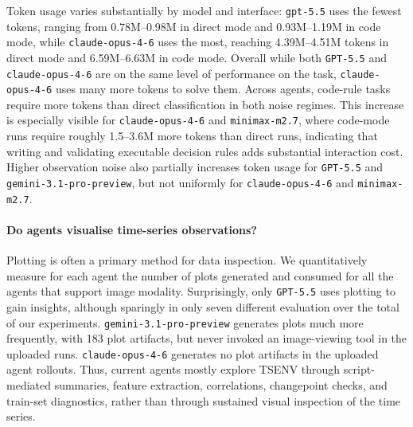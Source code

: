 Token usage varies substantially by model and interface: \texttt{gpt-5.5} uses the fewest tokens, ranging from 0.78M--0.98M in direct mode and 0.93M--1.19M in code mode, while \texttt{claude-opus-4-6} uses the most, reaching 4.39M--4.51M tokens in direct mode and 6.59M--6.63M in code mode.
Overall while both \texttt{GPT-5.5} and \texttt{claude-opus-4-6} are on the same level of performance on the task, \texttt{claude-opus-4-6} uses many more tokens to solve them.
Across agents, code-rule tasks require more tokens than direct classification in both noise regimes.
This increase is especially visible for \texttt{claude-opus-4-6} and \texttt{minimax-m2.7}, where code-mode runs require roughly 1.5--3.6M more tokens than direct runs, indicating that writing and validating executable decision rules adds substantial interaction cost.
Higher observation noise also partially increases token usage for \texttt{GPT-5.5} and \texttt{gemini-3.1-pro-preview}, but not uniformly for \texttt{claude-opus-4-6} and  \texttt{minimax-m2.7}.




\begin{table}[ht]
\centering
\caption{Cumulative token usage for the main experiment, in millions of tokens.}
\label{tab:cum-main-experiment-table}

\end{table}
\FloatBarrier

\paragraph{Do agents visualise time-series observations?}
Plotting is often a primary method for data inspection. 
We quantitatively measure for each agent the number of plots generated and consumed for all the agents that support image modality. 
Surprisingly, only \texttt{GPT-5.5} uses plotting to gain insights, although sparingly in only seven different evaluation over the total of our experiments.
\texttt{gemini-3.1-pro-preview} generates plots much more frequently, with 183 plot artifacts, but never invoked an image-viewing tool in the uploaded runs. 
\texttt{claude-opus-4-6} generates no plot artifacts in the uploaded agent rollouts. 
Thus, current agents mostly explore TSENV through script-mediated summaries, feature extraction, correlations, changepoint checks, and train-set diagnostics, rather than through sustained visual inspection of the time series.





